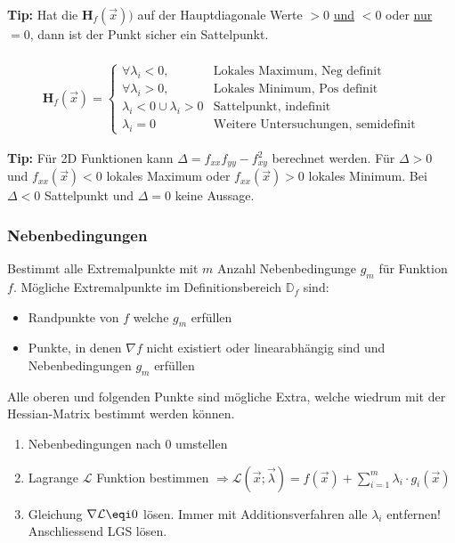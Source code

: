 \noindent\textbf{Tip:} Hat die $\mathbf{H}_f(\vec{x}))$ auf der Hauptdiagonale Werte $>0$ \underline{und} $<0$ oder \underline{nur} $=0$, dann ist der Punkt sicher ein Sattelpunkt.\\~\\

\begin{align*}
	\mathbf{H}_f(\vec{x}) = \begin{cases*}
		\forall \lambda_i < 0, & \text{Lokales Maximum, Neg definit} \\
		\forall \lambda_i > 0, & \text{Lokales Minimum, Pos definit} \\
		\lambda_i < 0 \cup \lambda_i > 0 & \text{Sattelpunkt, indefinit} \\
		\lambda_i = 0 & \text{Weitere Untersuchungen, semidefinit}
	\end{cases*}
\end{align*}

\noindent\textbf{Tip:} Für 2D Funktionen kann $\Delta = f_{xx}f_{yy} - f^2_{xy}$ berechnet werden. Für $\Delta>0$ und $f_{xx}(\vec{x})<0$ lokales Maximum oder $f_{xx}(\vec{x})>0$ lokales Minimum. Bei $\Delta < 0$ Sattelpunkt und $\Delta = 0$ keine Aussage. 

\subsubsection{Nebenbedingungen}
Bestimmt alle Extremalpunkte mit $m$ Anzahl Nebenbedingunge $g_m$ für Funktion $f$. Mögliche Extremalpunkte im Definitionsbereich $\mathbb{D}_f$ sind:
\begin{itemize}[nosep]
	\item Randpunkte von $f$ welche $g_m$ erfüllen
	\item Punkte, in denen $\nabla f$ nicht existiert oder linearabhängig sind und Nebenbedingungen $g_m$ erfüllen
\end{itemize}
Alle oberen und folgenden Punkte sind mögliche Extra, welche wiedrum mit der Hessian-Matrix bestimmt werden können.
\begin{enumerate}[nosep]
	\item Nebenbedingungen nach $0$ umstellen
	\item Lagrange $\mathcal{L}$ Funktion bestimmen $\Rightarrow \mathcal{L}(\vec{x};\vec{\lambda}) = f(\vec{x}) + \sum_{i=1}^{m}\lambda_i\cdot g_i(\vec{x})$
	\item Gleichung $\nabla\mathcal{L} \eqi 0$ lösen. Immer mit Additionsverfahren alle $\lambda_i$ entfernen! Anschliessend LGS lösen.
\end{enumerate}

